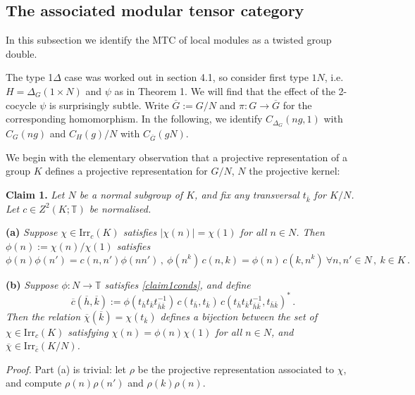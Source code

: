 \documentclass[12pt]{article}
\numberwithin{equation}{section}
\def\bbT           {\mathbb{T}}
\begin{document}
\subsection{The associated modular tensor category}

In this subsection we identify the MTC of local modules as a twisted group double. 


The type 1$\Delta$ case was worked out in section 4.1, so consider first type ${1N}$, i.e. $H=\Delta_G(1\times N)$ and  $\psi$ as in Theorem 1. We will find that the effect of the 2-cocycle $\psi$ is surprisingly subtle.  
Write $\overline{G}:= G/N$ and $\pi:G\rightarrow\overline{G}$ for the corresponding homomorphism.
 In the following, we  identify
$C_{\Delta_G}(ng,1)$ with $C_G(ng)$ and  $C_H(g)/N$ with $C_{\overline{G}}(gN)$.


We begin with the elementary observation that a projective representation of a group $K$ defines a projective representation for $G/N$, $N$ the
projective kernel:

\medskip\noindent\textbf{Claim 1.} \textit{Let $N$ be a normal subgroup 
of $K$, and fix any transversal $t_{\bar{k}}$ for $K/N$. Let $c\in Z^2(K;\bbT)$ be normalised.}

\smallskip\noindent\textbf{(a)} \textit{Suppose $\chi\in\mathrm{Irr}_c(K)$ satisfies $|\chi(n)|=\chi(1)$ for all $n\in N$. Then $\phi(n):=\chi(n)/\chi(1)$ satisfies}
\begin{equation}\phi(n)\phi(n')=c(n,n')\phi(nn')\,,\ \phi(n^k)\,c(n,k)=\phi(n)\,c(k,n^k)\ \forall n,n'\in N\,,\ k\in K\,.\label{claim1conds}\end{equation} 

\noindent\textbf{(b)} \textit{Suppose $\phi:N\rightarrow\bbT$ satisfies \eqref{claim1conds}, and define 
\begin{equation}\nonumber\overline{c}(\overline{h},\overline{k}):=\phi(t_{\bar{h}}t_{\bar{k}}t_{\bar{h}\bar{k}}^{-1})\,c(t_{\bar{h}},t_{\bar{k}})\,c(t_{\bar{h}}t_{\bar{k}}t_{\bar{h}\bar{k}}^{-1},t_{\bar{h}\bar{k}})^*\,.\end{equation}
 Then
the relation  $\overline{\chi}(\overline{k})=\chi(t_{\bar{k}})$ defines 
 a  bijection between the set of $\chi\in\mathrm{Irr}_{c}(K)$ satisfying $\chi(n)=\phi(n)\chi(1)$ for all $n\in N$, and $\overline{\chi}\in\mathrm{Irr}_{\bar{c}}(K/N)$.}\medskip 

\noindent\textit{Proof.} Part (a) is trivial: let $\rho$ be the projective representation associated to $\chi$, and compute $\rho(n)\rho(n')$ and $\rho(k)\rho(n)$.
\end{document}
